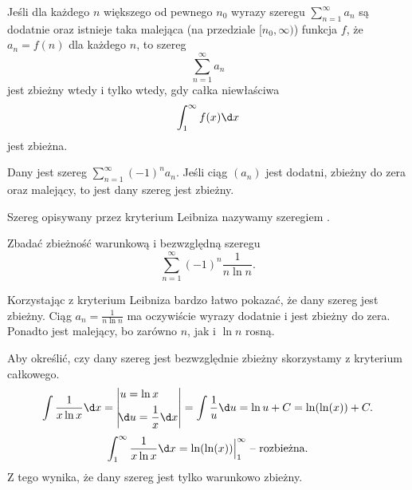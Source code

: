 \begin{theorem}
    Jeśli dla każdego $n$ większego od pewnego $n_0$ wyrazy szeregu $\sum_{n=1}^\infty a_n$ są dodatnie oraz istnieje taka malejąca (na przedziale $[n_0, \infty)$) funkcja $f$, że $a_n = f(n)$ dla każdego $n$, to szereg
    \[ \sum_{n=1}^\infty a_n \]
    jest zbieżny wtedy i tylko wtedy, gdy całka niewłaściwa
    \[ \int_1^\infty f(x) \d x \]
    jest zbieżna.
\end{theorem}

\begin{theorem}
    Dany jest szereg $\sum_{n=1}^\infty (-1)^na_n$. Jeśli ciąg $(a_n)$ jest dodatni, zbieżny do zera oraz malejący, to jest dany szereg jest zbieżny.
\end{theorem}

Szereg opisywany przez kryterium Leibniza nazywamy szeregiem .

\begin{example}
    Zbadać zbieżność warunkową i bezwzględną szeregu
    \[ \sum_{n=1}^\infty (-1)^n \frac{1}{n\ln{n}}. \]
\end{example}
\begin{solution}
    Korzystając z kryterium Leibniza bardzo łatwo pokazać, że dany szereg jest zbieżny. Ciąg $a_n = \frac{1}{n\ln{n}}$ ma oczywiście wyrazy dodatnie i jest zbieżny do zera. Ponadto jest malejący, bo zarówno $n$, jak i $\ln{n}$ rosną.

    Aby określić, czy dany szereg jest bezwzględnie zbieżny skorzystamy z kryterium całkowego.
    \[ \int \frac{1}{x\ln{x}} \d x = \left|\begin{alignedat}{2}&u = \ln{x} \\ &\!\d u = \frac{1}{x} \d x\end{alignedat}\right| = \int \frac{1}{u} \d u = \ln{u} + C = \ln(\ln(x)) + C. \]
    \[ \int_1^\infty \frac{1}{x\ln{x}} \d x = \ln(\ln(x)) \Big|_1^\infty \text{ -- rozbieżna.} \]
    Z tego wynika, że dany szereg jest tylko warunkowo zbieżny.
\end{solution}